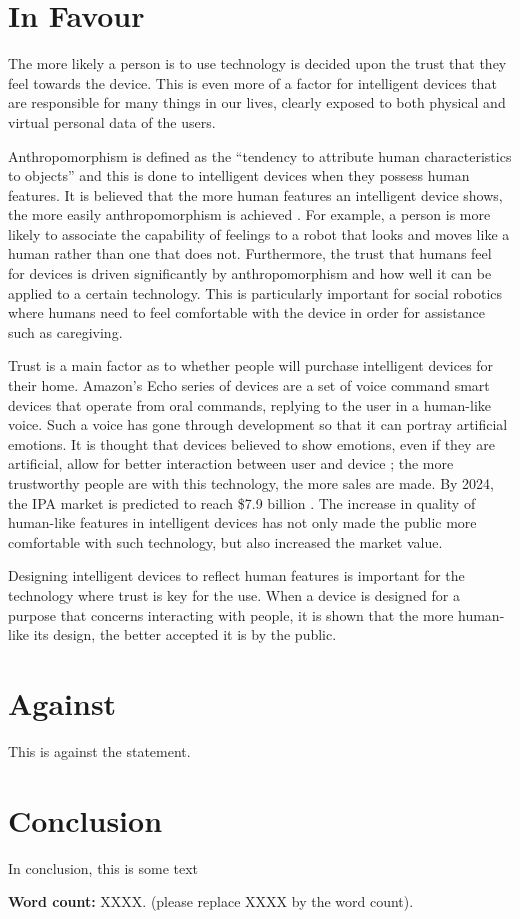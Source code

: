 \documentclass{article}
\begin{document}
\section{In Favour}
The more likely a person is to use technology is decided upon the trust that they feel towards the device. This is even more of a factor for intelligent devices that are responsible for many things in our lives, clearly exposed to both physical and virtual personal data of the users.\par
Anthropomorphism is defined as the “tendency to attribute human characteristics to objects” \cite{woods2004anthropomorphism} and this is done to intelligent devices when they possess human features. It is believed that the more human features an intelligent device shows, the more easily anthropomorphism is achieved \cite{vanPinxteren2019features}. For example, a person is more likely to associate the capability of feelings to a robot that looks and moves like a human rather than one that does not. Furthermore, the trust that humans feel for devices is driven significantly by anthropomorphism \cite{woods2004anthropomorphism} and how well it can be applied to a certain technology. This is particularly important for social robotics where humans need to feel comfortable with the device in order for assistance such as caregiving.\par
Trust is a main factor as to whether people will purchase intelligent devices for their home. Amazon’s Echo series of devices are a set of voice command smart devices that operate from oral commands, replying to the user in a human-like voice. Such a voice has gone through development so that it can portray artificial emotions. It is thought that devices believed to show emotions, even if they are artificial, allow for better interaction between user and device \cite{buiu2011emotions}; the more trustworthy people are with this technology, the more sales are made. By 2024, the IPA market is predicted to reach \$7.9 billion \cite{tmr2016market}. The increase in quality of human-like features in intelligent devices has not only made the public more comfortable with such technology, but also increased the market value.\par
Designing intelligent devices to reflect human features is important for the technology where trust is key for the use. When a device is designed for a purpose that concerns interacting with people, it is shown that the more human-like its design, the better accepted it is by the public.


\section{Against}
This is against the statement.

\section{Conclusion}
In conclusion, this is some text

\vspace{.5cm}
\noindent \textbf{Word count:} XXXX. (please replace XXXX by the word count).



\end{document}
